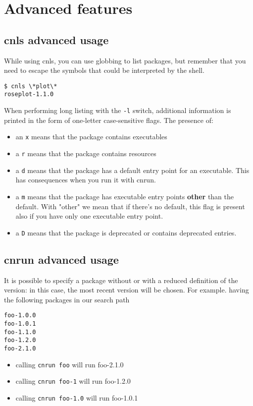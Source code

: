 \section{Advanced features}


\subsection{cnls advanced usage}

While using cnls, you can use globbing to list packages, but remember that you need to escape the symbols that could be interpreted by the shell.
\begin{verbatim}
$ cnls \*plot\*
roseplot-1.1.0
\end{verbatim}

When performing long listing with the \verb+-l+ switch, additional
information is printed in the form of one-letter case-sensitive flags.
The presence of:
    \begin{itemize}
    \item an \verb+x+ means that the package contains executables
    \item a \verb+r+ means that the package contains resources
    \item a \verb+d+ means that the package has a default entry point for an
    executable. This has consequences when you run it with cnrun.
    \item a \verb+m+ means that the package has executable entry points
    \textbf{other} than the default. With "other" we mean that if there's no
    default, this flag is present also if you have only one executable entry
    point.
    \item a \verb+D+ means that the package is deprecated or contains deprecated entries.
    \end{itemize}


\subsection{cnrun advanced usage }

It is possible to specify a package without or with a reduced definition of the
version: in this case, the most recent version will be chosen. For example.
having the following packages in our search path
\begin{verbatim}
foo-1.0.0
foo-1.0.1
foo-1.1.0
foo-1.2.0
foo-2.1.0
\end{verbatim}
\begin{itemize}
\item calling \verb+cnrun foo+ will run foo-2.1.0
\item calling \verb+cnrun foo-1+ will run foo-1.2.0
\item calling \verb+cnrun foo-1.0+ will run foo-1.0.1
\end{itemize}

